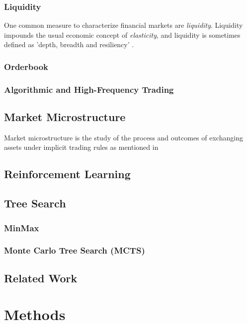 \documentclass{kththesis}
\theoremstyle{definition}
\begin{document}
\subsection{Liquidity}
One common measure to characterize financial markets are \textit{liquidity}. Liquidity impounds the usual economic concept of \textit{elasticity}, and liquidity is sometimes defined as 'depth, breadth and resiliency' \parencite{hasbrouck2007empirical}.

\subsection{Orderbook}

\subsection{Algorithmic and High-Frequency Trading}


\section{Market Microstructure}
Market microstructure is the study of the process and outcomes of exchanging assets under implicit trading rules as mentioned in\textcite{o1995market}

\section{Reinforcement Learning}


\section{Tree Search}

\subsection{MinMax}

\subsection{Monte Carlo Tree Search (MCTS)}

\section{Related Work}


\chapter{Methods}
\end{document}
